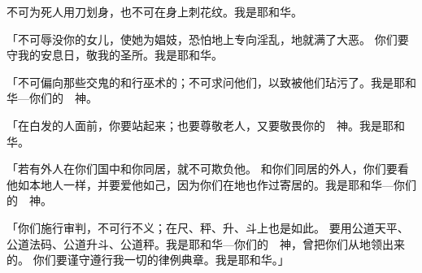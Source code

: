 {不可为死人用刀划身，也不可在身上刺花纹。我是耶和华。
\par }{\PP {}「不可辱没你的女儿，使她为娼妓，恐怕地上{}专向淫乱，地就满了大恶。
你们要守我的安息日，敬我的圣所。我是耶和华。
\par }{\PP {}「不可偏向那些交鬼的和行巫术的；不可求问他们，以致被他们玷污了。我是耶和华—你们的　神。
\par }{\PP {}「在白发的人面前，你要站起来；也要尊敬老人，又要敬畏你的　神。我是耶和华。
\par }{\PP {}「若有外人在你们国中和你同居，就不可欺负他。
和你们同居的外人，你们要看他如本地人一样，并要爱他如己，因为你们在{}地也作过寄居的。我是耶和华—你们的　神。
\par }{\PP {}「你们施行审判，不可行不义；在尺、秤、升、斗上也是如此。
要用公道天平、公道法码、公道升斗、公道秤。我是耶和华—你们的　神，曾把你们从{}地领出来的。
你们要谨守遵行我一切的律例典章。我是耶和华。」

}
